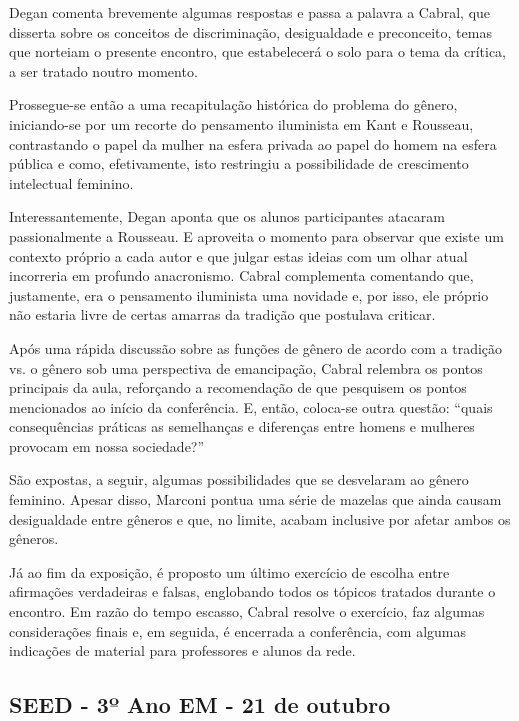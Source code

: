 \documentclass[12pt,a4paper]{article}
\begin{document}
	Degan comenta brevemente algumas respostas e passa a palavra a 
	Cabral, que disserta sobre os conceitos de discriminação, 
	desigualdade e preconceito, temas que norteiam o presente 
	encontro, que estabelecerá o solo para o tema da crítica, a 
	ser tratado noutro momento. 

	Prossegue-se então a uma recapitulação histórica do problema do 
	gênero, iniciando-se por um recorte do pensamento iluminista em 
	Kant e Rousseau, contrastando o papel da mulher na esfera 
	privada ao papel do homem na esfera pública e como, efetivamente, 
	isto restringiu a possibilidade de crescimento intelectual 
	feminino. 

	Interessantemente, Degan aponta que os alunos participantes 
	atacaram passionalmente a Rousseau. E aproveita o momento para 
	observar que existe um contexto próprio a cada autor e que 
	julgar estas ideias com um olhar atual incorreria em profundo 
	anacronismo. Cabral complementa comentando que, justamente, 
	era o pensamento iluminista uma novidade e, por isso, ele 
	próprio não estaria livre de certas amarras da tradição que 
	postulava criticar. 

	Após uma rápida discussão sobre as funções de gênero de acordo 
	com a tradição vs. o gênero sob uma perspectiva de emancipação, 
	Cabral relembra os pontos principais da aula, reforçando a 
	recomendação de que pesquisem os pontos mencionados ao início da 
	conferência. E, então, coloca-se outra questão: “quais consequências 
	práticas as semelhanças e diferenças entre homens e mulheres 
	provocam em nossa sociedade?” 

	São expostas, a seguir, algumas possibilidades que se desvelaram 
	ao gênero feminino. Apesar disso, Marconi pontua uma série de 
	mazelas que ainda causam desigualdade entre gêneros e que, no 
	limite, acabam inclusive por afetar ambos os gêneros. 

	Já ao fim da exposição, é proposto um último exercício de escolha 
	entre afirmações verdadeiras e falsas, englobando todos os tópicos 
	tratados durante o encontro. Em razão do tempo escasso, Cabral 
	resolve o exercício, faz algumas considerações finais e, em seguida, 
	é encerrada a conferência, com algumas indicações de material para 
	professores e alunos da rede. 

	\subsection{SEED - 3º Ano EM - 21 de outubro}
\end{document}
